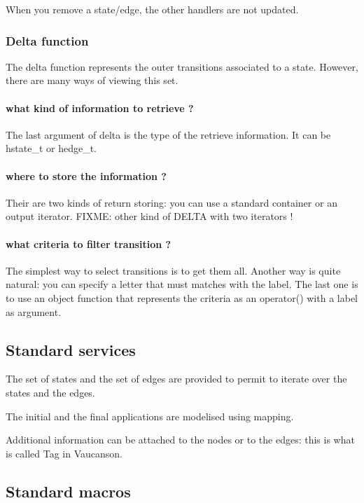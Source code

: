 \documentclass{article}
\begin{document}
When you remove a state/edge, the other handlers are not updated.

\subsubsection{Delta function}

The delta function represents the outer transitions associated to a state. However, there are many ways of viewing this set. 

\paragraph{what kind of information to retrieve ?}

The last argument of delta is the type of the retrieve information. It can be hstate\_t or hedge\_t.

\paragraph{where to store the information ?}

Their are two kinds of return storing: you can use a standard container or an output iterator. FIXME: other kind of DELTA with two iterators !

\paragraph{what criteria to filter transition ?}

The simplest way to select transitions is to get them all. Another way is quite natural: you can specify a letter that must matches with the label. The last one is to use an object function that represents the criteria as an operator() with a label as argument.

\subsection{Standard services}

The set of states and the set of edges are provided to permit to iterate over the states and the edges. 

The initial and the final applications are modelised using mapping. 

Additional information can be attached to  the nodes or to the edges: this is what is called Tag in Vaucanson.

\subsection{Standard macros}
\end{document}
